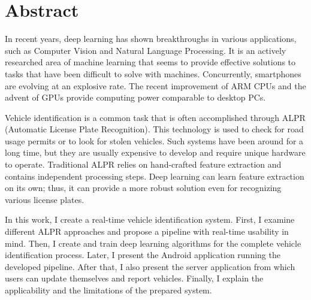 \chapter*{Abstract}

In recent years, deep learning has shown breakthroughs in various applications, such as Computer Vision and Natural Language Processing. It is an actively researched area of machine learning that seems to provide effective solutions to tasks that have been difficult to solve with machines. Concurrently, smartphones are evolving at an explosive rate. The recent improvement of ARM CPUs and the advent of GPUs provide computing power comparable to desktop PCs.

Vehicle identification is a common task that is often accomplished through ALPR (Automatic License Plate Recognition). This technology is used to check for road usage permits or to look for stolen vehicles. Such systems have been around for a long time, but they are usually expensive to develop and require unique hardware to operate. Traditional ALPR relies on hand-crafted feature extraction and contains independent processing steps. Deep learning can learn feature extraction on its own; thus, it can provide a more robust solution even for recognizing various license plates.

In this work, I create a real-time vehicle identification system. First, I examine different ALPR approaches and propose a pipeline with real-time usability in mind. Then, I create and train deep learning algorithms for the complete vehicle identification process. Later, I present the Android application running the developed pipeline. After that, I also present the server application from which users can update themselves and report vehicles. Finally, I explain the applicability and the limitations of the prepared system.

\vfill
\selectthesislanguage

\setcounter{romanPage}{\value{page}}

